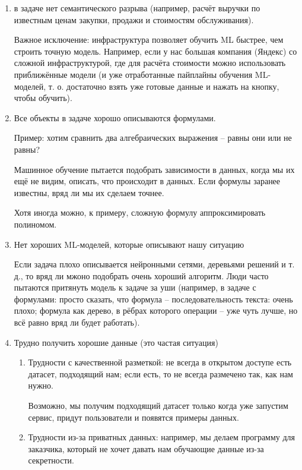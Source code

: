 \documentclass[main.tex]{subfiles}
\begin{document}
\begin{enumerate}[noitemsep]
    \item в задаче нет семантического разрыва (например, расчёт выручки по известным ценам закупки, продажи и стоимостям обслуживания).

    Важное исключение: инфраструктура позволяет обучить ML быстрее, чем строить точную модель.
    Например, если у нас большая компания (Яндекс) со сложной инфраструктурой, где для расчёта стоимости можно использовать приближённые модели (и уже отработанные пайплайны обучения ML-моделей, т. о. достаточно взять уже готовые данные и нажать на кнопку, чтобы обучить).
    \item Все объекты в задаче хорошо описываются формулами.

    Пример: хотим сравнить два алгебраических выражения -- равны они или не равны?

    Машинное обучение пытается подобрать зависимости в данных, когда мы их ещё не видим, описать, что происходит в данных.
    Если формулы заранее известны, вряд ли мы их сделаем точнее.

    Хотя иногда можно, к примеру, сложную формулу аппроксимировать полиномом.

    \item Нет хороших ML-моделей, которые описывают нашу ситуацию

    Если задача плохо описывается нейронными сетями, деревьями решений и т. д., то вряд ли мжоно подобрать очень хороший алгоритм.
    Люди часто пытаются притянуть модель к задаче за уши (например, в задаче с формулами: просто сказать, что формула -- последовательность текста: очень плохо; формула как дерево, в рёбрах которого операции -- уже чуть лучше, но всё равно вряд ли будет работать).

    \item Трудно получить хорошие данные (это частая ситуация)
    \begin{enumerate}[noitemsep]
        \item Трудности с качественной разметкой: не всегда в открытом доступе есть датасет, подходящий нам; если есть, то не всегда размечено так, как нам нужно.

        Возможно, мы получим подходящий датасет только когда уже запустим сервис, придут пользователи и появятся примеры данных.
        \item Трудности из-за приватных данных: например, мы делаем программу для заказчика, который не хочет давать нам обучающие данные из-за секретности.


\end{enumerate}
\end{enumerate}
\end{document}
